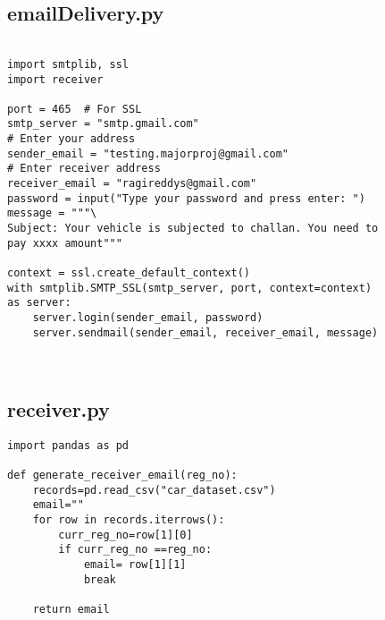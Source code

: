\documentclass[12pt,a4paper]{report}
\begin{document}
\newpage
\subsection{emailDelivery.py}
\begin{lstlisting}

import smtplib, ssl
import receiver

port = 465  # For SSL
smtp_server = "smtp.gmail.com"
# Enter your address
sender_email = "testing.majorproj@gmail.com"  
# Enter receiver address
receiver_email = "ragireddys@gmail.com"  
password = input("Type your password and press enter: ")
message = """\
Subject: Your vehicle is subjected to challan. You need to 
pay xxxx amount"""

context = ssl.create_default_context()
with smtplib.SMTP_SSL(smtp_server, port, context=context) 
as server:
    server.login(sender_email, password)
    server.sendmail(sender_email, receiver_email, message)
            
 
\end{lstlisting}

\newpage
\subsection{receiver.py}
\begin{lstlisting}
import pandas as pd

def generate_receiver_email(reg_no):
    records=pd.read_csv("car_dataset.csv")
    email=""
    for row in records.iterrows():
        curr_reg_no=row[1][0]
        if curr_reg_no ==reg_no:
            email= row[1][1]
            break

    return email
\end{lstlisting}

\newpage
\end{document}
